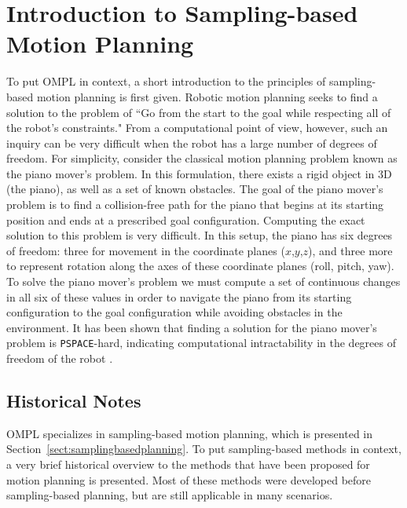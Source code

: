 \chapter{Introduction to Sampling-based Motion Planning}
\label{chp:motionplanning}

To put OMPL in context, a short introduction to the principles of
sampling-based motion planning is first given.  Robotic motion planning seeks
to find a solution to the problem of ``Go from the start to the goal while
respecting all of the robot's constraints."  From a computational point of view,
however, such an inquiry can be very difficult when the robot has a large
number of degrees of freedom.  For simplicity, consider the
classical motion planning problem known as the piano mover's problem.  In this
formulation, there exists a rigid object in 3D (the piano), as well as a set of
known obstacles.  The goal of the piano mover's problem is to find a
collision-free path for the piano that begins at its starting position and
ends at a prescribed goal configuration.  Computing the exact solution to
this problem is very difficult.  In this setup, the piano has six degrees of
freedom: three for movement in the coordinate planes ($x$,$y$,$z$), and three
more to represent rotation along the axes of these coordinate planes (roll,
pitch, yaw).  To solve the piano mover's problem we must compute a set of
continuous changes in all six of these values in order to navigate the piano
from its starting configuration to the goal configuration while avoiding
obstacles in the environment.  It has been shown that finding a solution for
the piano mover's problem is {\tt PSPACE}-hard, indicating computational
intractability in the degrees of freedom of the robot \cite{Latombe:1991,
Choset:2005, LaValle:2006}.

\section {Historical Notes}
OMPL specializes in sampling-based motion planning, which is presented in
Section~\ref {sect:samplingbasedplanning}.  To put sampling-based methods
in context, a very brief historical overview to the methods that have been
proposed for motion planning is presented.  Most of these methods were developed
before sampling-based planning, but are still applicable in many scenarios.

